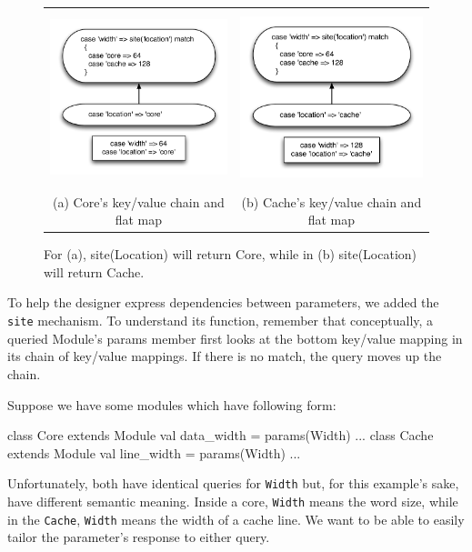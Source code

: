 \documentclass[10pt,twocolumn]{article}
\def\code#1{{\small\tt #1}}
\begin{document}
\begin{figure}
\begin{center}
\begin{tabular}{cc}
\includegraphics[height=2.0in]{figs/sitea.pdf} &
\includegraphics[height=2.0in]{figs/siteb.pdf} \\
(a) Core's key/value chain and flat map & (b) Cache's key/value chain and flat map \\
\end{tabular}
\end{center}
\caption{For (a), site(Location) will return Core, while in (b) site(Location) will return Cache.}
\label{fig:site}
\end{figure}
To help the designer express dependencies between parameters, we added the \code{site} mechanism. To understand its function, remember that conceptually, a queried Module's params member first looks at the bottom key/value mapping in its chain of key/value mappings. If there is no match, the query moves up the chain. 

Suppose we have some modules which have following form:

\begin{scala}
class Core extends Module {
  val data_width = params(Width)
  ...
}
class Cache extends Module {
  val line_width = params(Width)
  ...
}
\end{scala}
Unfortunately, both have identical queries for \code{Width} but, for this example's sake, have different semantic meaning. Inside a core, \code{Width} means the word size, while in the \code{Cache}, \code{Width} means the width of a cache line. We want to be able to easily tailor the parameter's response to either query.
\end{document}
